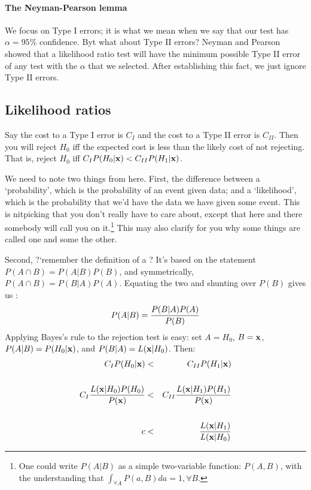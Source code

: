 \paragraph{The Neyman-Pearson lemma} 
We focus on Type I errors; it is what we mean when we say that our
test has $\alpha=95\%$ confidence. Byt what about Type II errors? 
Neyman and Pearson showed that a likelihood ratio test will have the
minimum possible Type II error of any test with the $\alpha$ that we
selected. After establishing this fact, we just ignore Type II errors.

\subsection{Likelihood ratios} 

Say the cost to a Type I error is $C_I$ and the cost to a Type II error
is $C_{II}$.  Then you will reject $H_0$ iff the expected cost is less
than the likely cost of not rejecting. That is, reject $H_0$ iff $C_I
P(H_0|{\bf x})<C_{II} P(H_1|{\bf x})$.

We need to note two things from here. First, the difference between a
`probability', which is the probability of an event given data; and a
`likelihood', which is the probability that we'd have the data we have
given some event. This is nitpicking that you don't really have to care
about, except that here and there somebody will call you on
it.\footnote{One could write $P(A|B)$ as a simple two-variable function:
$P(A,B)$, with the understanding that $\int_{\forall A} P(a,B)da = 1,
\forall B$.} This may
also clarify for you why some things are called one and some the other.

Second, ?`remember the definition of a ? It's based on the
statement $P(A\cap B)=P(A|B)P(B)$, and symmetrically, $P(A\cap B)=P(B|A)P(A)$.  Equating
the two and shunting over $P(B)$ gives us : $$P(A|B)={P(B|A) P(A)\over P(B)}$$
Applying Bayes's rule to the rejection test is easy: set $A=H_0$, $B={\bf x}$,
$P(A|B)=P(H_0|{\bf x})$, and $P(B|A)=L({\bf x}|H_0)$. Then:
\begin{eqnarray}
C_I P(H_0|{\bf x})&<&C_{II} P(H_1|{\bf x})\label{firstnp}\\
\nonumber\\
C_I {L({\bf x}|H_0)P(H_0)\over P({\bf x})}&<& C_{II} {L({\bf x}|H_1)P(H_1)\over P({\bf x})}\label{secondnp}\\
\nonumber\\
c&<& {L({\bf x}|H_1)\over L({\bf x}|H_0)}\label{thirdnp}
\end{eqnarray}

